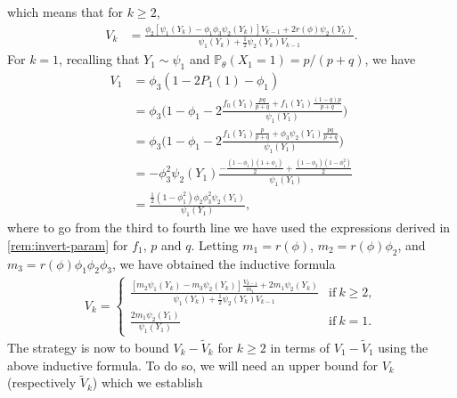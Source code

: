 \documentclass[journal]{IEEEtran}
\newcommand{\1}{\boldsymbol{1}}
\newcommand{\PP}{\mathbb{P}}
\begin{document}
  which means that for $k \geq 2$,
  \begin{align*}
	V_k%
	&= \frac{\phi_2[\psi_1(Y_k) - \phi_1\phi_3\psi_2(Y_k)]V_{k-1} + 2r(\phi)\psi_2(Y_k)}{\psi_1(Y_k) + \frac{1}{2}\psi_2(Y_k)V_{k-1}}.
  \end{align*}
  For $k =1$, recalling that $Y_1\sim \psi_1$ and $\PP_\theta(X_1=1)=p/(p+q)$, we have
  \begin{align*}
	V_1%
	&= \phi_3(1 - 2P_1(1) - \phi_1)\\
	&= \phi_3\Big(1 - \phi_1 - 2 \frac{f_0(Y_1)\frac{p q}{p+q} + f_1(Y_1)\frac{(1-q)p}{p+q}}{\psi_1(Y_1)} \Big)\\
	&= \phi_3\Big(1 - \phi_1 - 2 \frac{ f_1(Y_1)\frac{p}{p+q}
   + \phi_3 \psi_2(Y_1)\frac{p q}{p+q}}{\psi_1(Y_1)} \Big)\\
	&= -\phi_3^2\psi_2(Y_1) \frac{ -\frac{(1-\phi_1)(1+\phi_1)}{2} + \frac{(1-\phi_2)(1-\phi_1^2)}{2} }{\psi_1(Y_1)}\\
	&= \frac{\frac{1}{2}(1-\phi_1^2)\phi_2\phi_3^2\psi_2(Y_1)}{\psi_1(Y_1)},
  \end{align*}
  where to go from the third to fourth line we have used the expressions derived in  \cref{rem:invert-param} for $f_1$, $p$ and $q$. Letting $m_1 = r(\phi)$, $m_2 = r(\phi)\phi_2$, and
  $m_3 = r(\phi)\phi_1\phi_2\phi_3$, we have obtained the inductive formula
  \begin{align*}
	V_k =
	\begin{cases}
	  \frac{[m_2\psi_1(Y_k) - m_3\psi_2(Y_k)] \frac{V_{k-1}}{m_1} + 2m_1 \psi_2(Y_k) }%
	  {\psi_1(Y_k) + \frac{1}{2}\psi_2(Y_k)V_{k-1}} &\mathrm{if}\ k\geq 2,\\
	  \frac{2m_1 \psi_2(Y_1)}{\psi_1(Y_1)} &\mathrm{if}\ k=1.
	\end{cases}
  \end{align*}
  The strategy is now to bound $V_k - \tilde{V}_k$ for $k \geq 2$ in terms of
  $V_1 - \tilde{V}_1$ using the above inductive formula. To do so, we will need
  an upper bound for $V_k$ (respectively $\tilde{V}_k$) which we establish
\end{document}
